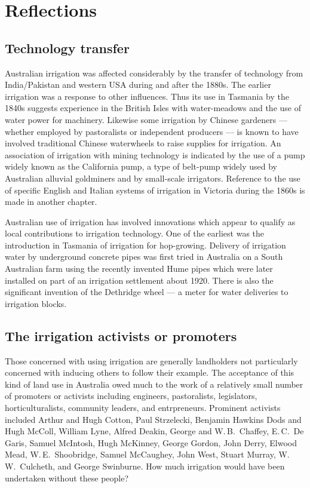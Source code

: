 
\chapter{Reflections}

\section{Technology transfer}

Australian irrigation was affected considerably by the transfer of
technology from India/Pakistan and western USA during and after the
1880s.  The earlier irrigation was a response to other
influences. Thus its use in Tasmania by the 1840s suggests experience
in the British Isles with water-meadows and the use of water power for
machinery.  Likewise some irrigation by Chinese gardeners --- whether
employed by pastoralists or independent producers --- is known to have
involved traditional Chinese waterwheels to raise supplies for
irrigation.  An association of irrigation with mining technology is
indicated by the use of a pump widely known as the California pump, a
type of belt-pump widely used by Australian alluvial goldminers and by
small-scale irrigators.  Reference to the use of specific English and
Italian systems of irrigation in Victoria during the 1860s is made in
another chapter.

Australian use of irrigation has involved innovations which appear to
qualify as local contributions to irrigation technology.  One of the
earliest was the introduction in Tasmania of irrigation for
hop-growing.  Delivery of irrigation water by underground concrete
pipes was first tried in Australia on a South Australian farm using
the recently invented Hume pipes which were later installed on part of
an irrigation settlement about 1920.  There is also the significant
invention of the Dethridge wheel --- a meter for water deliveries to
irrigation blocks.

\section{The irrigation activists or promoters}

Those concerned with using irrigation are generally landholders not
particularly concerned with inducing others to follow their example.
The acceptance of this kind of land use in Australia owed much to the
work of a relatively small number of promoters or activists including
engineers, pastoralists, legislators, horticulturalists, community
leaders, and entrpreneurs.  Prominent activists included Arthur and
Hugh Cotton, Paul Strzelecki, Benjamin Hawkins Dods and Hugh McColl,
William Lyne, Alfred Deakin, George and W.\,B.~Chaffey, E.\,C.~De
Garis, Samuel McIntosh, Hugh McKinney, George Gordon, John Derry,
Elwood Mead, W.\,E.~Shoobridge, Samuel McCaughey, John West, Stuart
Murray, W.\,W.~Culcheth, and George Swinburne. How much irrigation
would have been undertaken without these people?

